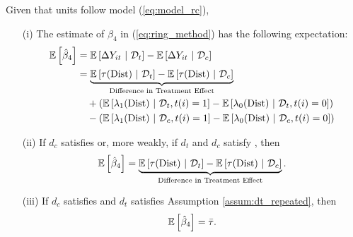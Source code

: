 \documentclass[10pt]{article}
\newcommand{\dist}{\text{Dist}}
\begin{document}
\begin{proposition}\label{prop:ring_decomp_rc}  
    Given that units follow model (\ref{eq:model_rc}),
    \begin{enumerate}
        \item[(i)] The estimate of $\beta_4$ in (\ref{eq:ring_method}) has the following expectation:
        \begin{align*}
            \expec{\hat{\beta}_4} &= \condexpec{\Delta Y_{it}}{\mathcal{D}_t} - \condexpec{\Delta Y_{it}}{\mathcal{D}_c} \\
            &=  \underbrace{\condexpec{\tau(\dist)}{\mathcal{D}_t} - \condexpec{\tau(\dist)}{\mathcal{D}_c} }_{\text{Difference in Treatment Effect}} \\
            &\quad + ( \condexpec{\lambda_1(\dist)}{\mathcal{D}_t, t(i) = 1} - \condexpec{\lambda_0(\dist)}{\mathcal{D}_t, t(i) = 0} ) \\
            &\quad - ( \condexpec{\lambda_1(\dist)}{\mathcal{D}_c, t(i) = 1} - \condexpec{\lambda_0(\dist)}{\mathcal{D}_c, t(i) = 0} )   \\
        \end{align*}
        
        \item[(ii)] If $d_c$ satisfies  or, more weakly, if $d_t$ and $d_c$ satisfy , then
        \[ 
            \expec{\hat{\beta}_4} = 
            \underbrace{\condexpec{\tau(\dist)}{\mathcal{D}_t} - \condexpec{\tau(\dist)}{\mathcal{D}_c} }_{\text{Difference in Treatment Effect}}.
        \] 
    
        \item[(iii)] If $d_c$ satisfies  and $d_t$ satisfies Assumption \ref{assum:dt_repeated}, then
        \[ 
            \mathbb{E}\left[\hat{\beta}_4\right] = \bar{\tau}.
        \]
    \end{enumerate}
\end{proposition}
\end{document}
